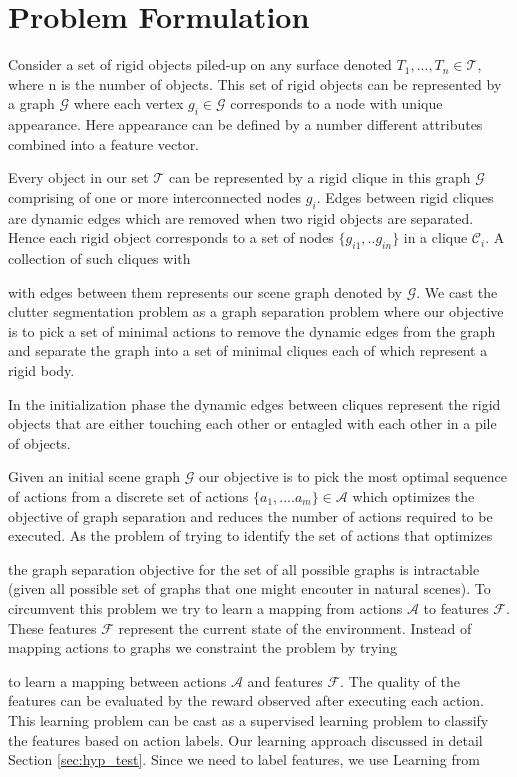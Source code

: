 \section{Problem Formulation}
\label{sec:problem}
Consider a set of rigid objects piled-up on any surface denoted $T_1,...,T_n \in \mathcal{T}$, where n is the number of objects. This set of rigid objects can be represented by a graph $\mathcal{G}$ where each vertex $g_i \in \mathcal{G}$ corresponds to a node with unique appearance. Here appearance can be defined by a number different attributes combined into a feature vector.

Every object in our set $\mathcal{T}$ can be represented by a rigid clique in this graph $\mathcal{G}$ comprising of one or more interconnected nodes $g_i$. Edges between rigid cliques are dynamic edges which are removed when two rigid objects are separated. Hence each rigid object corresponds to a set of nodes $\{g_{i1},..g_{in}\}$ in a clique $\mathcal{C}_i$. A collection of such cliques with 

with edges between them represents our scene graph denoted by $\mathcal{G}$. We cast the clutter segmentation problem as a graph separation problem where our objective is to pick a set of minimal actions to remove the dynamic edges from the graph and separate the graph into a set of minimal cliques each of which represent a rigid body.

In the initialization phase the dynamic edges between cliques represent the rigid objects that are either touching each other or entagled with each other in a pile of objects.

Given an initial scene graph $\mathcal{G}$ our objective is to pick the most optimal sequence of actions from a discrete set of actions $\{a_1,....a_m\} \in \mathcal{A}$ which optimizes the objective of graph separation and reduces the number of actions required to be executed. As the problem of trying to identify the set of actions that optimizes

the graph separation objective for the set of all possible graphs is intractable (given all possible set of graphs that one might encouter in natural scenes). To circumvent this problem we try to learn a mapping from actions $\mathcal{A}$ to features $\mathcal{F}$. These features $\mathcal{F}$ represent the current state of the environment. Instead of mapping actions to graphs we constraint the problem by trying

to learn a mapping between actions $\mathcal{A}$ and features $\mathcal{F}$. The quality of the features can be evaluated by the reward observed after executing each action. This learning problem can be cast as a supervised learning problem to classify the features based on action labels. Our learning approach discussed in detail Section \ref{sec:hyp_test}. Since we need to label features, we use Learning from 

